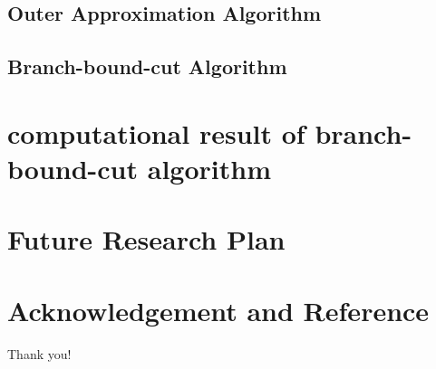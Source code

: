\documentclass[10pt]{beamer}
\begin{document}
\subsection{Outer Approximation Algorithm}
\subsection{Branch-bound-cut Algorithm}

\section{computational result of branch-bound-cut algorithm}

\section{Future Research Plan}

\section{Acknowledgement and Reference}
\begin{frame}
\textcolor{myNewColorA}{\Huge{\centerline{Thank you!}}}
\end{frame}

\begin{frame}
{\small


}
\end{frame}
\end{document}
